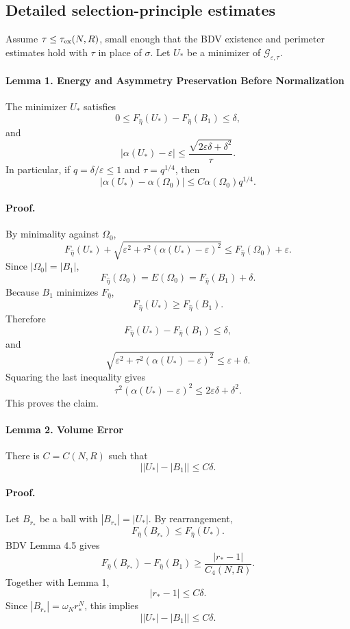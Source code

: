 \documentclass[11pt]{amsart}
\theoremstyle{definition}
\begin{document}
\subsection{Detailed selection-principle estimates}\label{ss:selection-details}

Assume \(\tau\le\tau_{\rm ex}(N,R)\), small enough that the BDV existence and
perimeter estimates hold with \(\tau\) in place of \(\sigma\). Let
\(U_*\) be a minimizer of \(\mathcal G_{\varepsilon,\tau}\).

\paragraph{Lemma 1. Energy and Asymmetry Preservation Before Normalization}

The minimizer \(U_*\) satisfies
\[
0\le
F_{\hat\eta}(U_*)-F_{\hat\eta}(B_1)
\le
\delta,
\]
and
\[
|\alpha(U_*)-\varepsilon|
\le
\frac{\sqrt{2\varepsilon\delta+\delta^2}}{\tau}.
\]
In particular, if \(q=\delta/\varepsilon\le1\) and \(\tau=q^{1/4}\), then
\[
|\alpha(U_*)-\alpha(\Omega_0)|
\le
C\alpha(\Omega_0)q^{1/4}.
\]

\paragraph{Proof.}
By minimality against \(\Omega_0\),
\[
F_{\hat\eta}(U_*)
+
\sqrt{\varepsilon^2+\tau^2(\alpha(U_*)-\varepsilon)^2}
\le
F_{\hat\eta}(\Omega_0)+\varepsilon.
\]
Since \(|\Omega_0|=|B_1|\),
\[
F_{\hat\eta}(\Omega_0)=E(\Omega_0)
=F_{\hat\eta}(B_1)+\delta.
\]
Because \(B_1\) minimizes \(F_{\hat\eta}\),
\[
F_{\hat\eta}(U_*)\ge F_{\hat\eta}(B_1).
\]
Therefore
\[
F_{\hat\eta}(U_*)-F_{\hat\eta}(B_1)\le\delta,
\]
and
\[
\sqrt{\varepsilon^2+\tau^2(\alpha(U_*)-\varepsilon)^2}
\le
\varepsilon+\delta.
\]
Squaring the last inequality gives
\[
\tau^2(\alpha(U_*)-\varepsilon)^2
\le
2\varepsilon\delta+\delta^2.
\]
This proves the claim.

\paragraph{Lemma 2. Volume Error}

There is \(C=C(N,R)\) such that
\[
\bigl||U_*|-|B_1|\bigr|
\le
C\delta.
\]

\paragraph{Proof.}
Let \(B_{r_*}\) be a ball with \(|B_{r_*}|=|U_*|\). By rearrangement,
\[
F_{\hat\eta}(B_{r_*})\le F_{\hat\eta}(U_*).
\]
BDV Lemma 4.5 gives
\[
F_{\hat\eta}(B_{r_*})-F_{\hat\eta}(B_1)
\ge
\frac{|r_*-1|}{C_4(N,R)}.
\]
Together with Lemma 1,
\[
|r_*-1|\le C\delta.
\]
Since \(|B_{r_*}|=\omega_N r_*^N\), this implies
\[
\bigl||U_*|-|B_1|\bigr|\le C\delta.
\]
\end{document}
